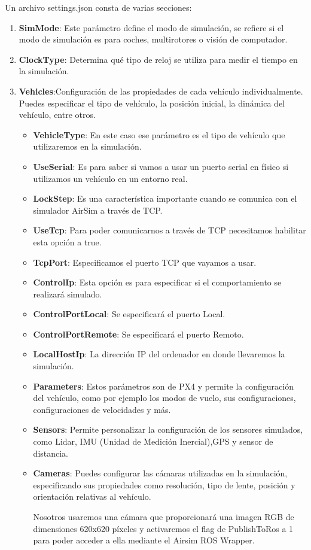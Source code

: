 Un archivo settings.json consta de varias secciones: 
\begin{enumerate}
  \item \textbf{SimMode}: Este parámetro define el modo de simulación, se refiere si el modo de simulación es para coches, multirotores o visión de computador.
  \item \textbf{ClockType}: Determina qué tipo de reloj se utiliza para medir el tiempo en la simulación. 
  \item \textbf{Vehicles}:Configuración de  las propiedades de cada vehículo individualmente. Puedes especificar el tipo de vehículo, la posición inicial, la dinámica del vehículo, entre otros.
  \begin{itemize}
    \item \textbf{VehicleType}: En este caso ese parámetro es el tipo de vehículo que utilizaremos en la simulación.
    \item \textbf{UseSerial}: Es para saber si vamos a usar un puerto serial en físico si utilizamos un vehículo en un entorno real.
    \item \textbf{LockStep}: Es una característica importante cuando se comunica con el simulador AirSim a través de TCP.
    \item \textbf{UseTcp}: Para poder comunicarnos a través de TCP necesitamos habilitar esta opción a true.
    \item \textbf{TcpPort}: Especificamos el puerto TCP que vayamos a usar. 
    \item \textbf{ControlIp}: Esta opción es para especificar si el comportamiento se realizará simulado.
    \item \textbf{ControlPortLocal}: Se especificará el puerto Local. 
    \item \textbf{ControlPortRemote}: Se especificará el puerto Remoto.
    \item \textbf{LocalHostIp}: La dirección IP del ordenador en donde llevaremos la simulación.
    \item \textbf{Parameters}: Estos parámetros son de PX4 y permite la configuración del vehículo,
    como por ejemplo los modos de vuelo, sus configuraciones, configuraciones de velocidades y más. 
    \item \textbf{Sensors}: Permite personalizar la configuración de los sensores simulados, como Lidar, IMU (Unidad de Medición Inercial),GPS y sensor de distancia. 
    \item \textbf{Cameras}: Puedes configurar las cámaras utilizadas en la simulación, especificando sus propiedades como resolución, tipo de lente, posición y orientación relativas al vehículo.\newline 
    
    Nosotros usaremos una cámara que proporcionará una imagen RGB de dimensiones 620x620 píxeles y activaremos
    el flag de PublishToRos a 1 para poder acceder a ella mediante el Airsim ROS Wrapper.
  \end{itemize}
\end{enumerate}

